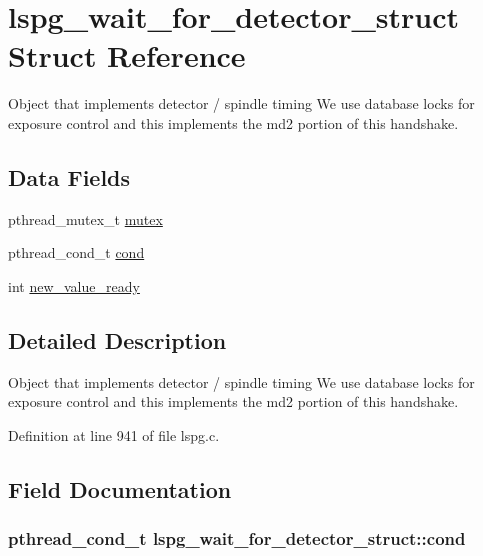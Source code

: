 \hypertarget{structlspg__wait__for__detector__struct}{\section{lspg\-\_\-wait\-\_\-for\-\_\-detector\-\_\-struct Struct Reference}
\label{structlspg__wait__for__detector__struct}
}


Object that implements detector / spindle timing We use database locks for exposure control and this implements the md2 portion of this handshake.  


\subsection*{Data Fields}
\begin{DoxyCompactItemize}
\item 
pthread\-\_\-mutex\-\_\-t \hyperlink{structlspg__wait__for__detector__struct_a958e9fe59e671e61f95c2ce796ba24ce}{mutex}
\item 
pthread\-\_\-cond\-\_\-t \hyperlink{structlspg__wait__for__detector__struct_aa97388f93ca5099196ba0da1e4a5b7bb}{cond}
\item 
int \hyperlink{structlspg__wait__for__detector__struct_ad950e85c70c4473c5c7c40f8ceeae61d}{new\-\_\-value\-\_\-ready}
\end{DoxyCompactItemize}


\subsection{Detailed Description}
Object that implements detector / spindle timing We use database locks for exposure control and this implements the md2 portion of this handshake. 

Definition at line 941 of file lspg.\-c.



\subsection{Field Documentation}
\hypertarget{structlspg__wait__for__detector__struct_aa97388f93ca5099196ba0da1e4a5b7bb}{
\subsubsection[{cond}]{\setlength{\rightskip}{0pt plus 5cm}pthread\-\_\-cond\-\_\-t lspg\-\_\-wait\-\_\-for\-\_\-detector\-\_\-struct\-::cond}}\label{structlspg__wait__for__detector__struct_aa97388f93ca5099196ba0da1e4a5b7bb}


